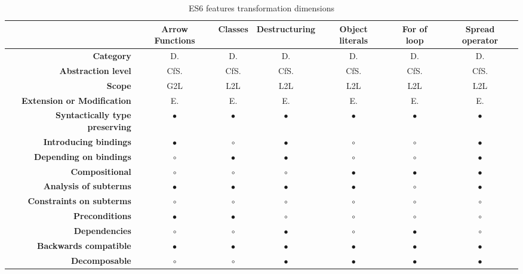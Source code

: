 \begin{landscape}		
\centering

\begin{table}[h]
\caption{ES6 features transformation dimensions}
\label{full-table}
\begin{tabular}{rcccccc}
\hline
& {\bf Arrow Functions} & {\bf Classes} & {\bf Destructuring} & {\bf Object literals} & {\bf For of loop} & {\bf Spread operator} \\ \hline
{\bf Category} & D. & D. & D. & D. & D. & D. \\
{\bf Abstraction level} & CfS. & CfS. & CfS. & CfS. & CfS. & CfS. \\
{\bf Scope} & G2L & L2L & L2L & L2L & L2L & L2L \\
{\bf Extension or Modification} & E. & E. & E. & E. & E. & E. \\
{\bf Syntactically type preserving} & $\bullet$ & $\bullet$ & $\bullet$ & $\bullet$ & $\bullet$ & $\bullet$ \\
{\bf Introducing bindings} & $\bullet$ & $\circ$ & $\bullet$ & $\circ$ & $\circ$ & $\bullet$ \\
{\bf Depending on bindings} & $\circ$ & $\bullet$ & $\bullet$ & $\circ$ & $\circ$ & $\bullet$ \\
{\bf Compositional} & $\circ$ & $\circ$ & $\circ$ & $\bullet$ & $\bullet$ & $\bullet$ \\
{\bf Analysis of subterms} & $\bullet$ & $\bullet$ & $\bullet$ & $\bullet$ & $\circ$ & $\bullet$  \\
{\bf Constraints on subterms} & $\circ$ & $\circ$ & $\circ$ & $\circ$ & $\circ$ & $\circ$   \\
{\bf Preconditions} & $\bullet$ & $\bullet$ & $\circ$ & $\circ$ & $\circ$ & $\circ$   \\
{\bf Dependencies}  & $\circ$ & $\circ$ & $\bullet$ & $\circ$ & $\bullet$ & $\circ$   \\
{\bf Backwards compatible} & $\bullet$ & $\bullet$ & $\bullet$ & $\bullet$ & $\bullet$ & $\bullet$  \\
{\bf Decomposable} & $\circ$ & $\circ$ & $\bullet$ & $\bullet$ & $\bullet$ & $\bullet$  \\ \hline
\end{tabular}
\vspace*{0.5cm}
\newline


\end{table}
\end{landscape}
